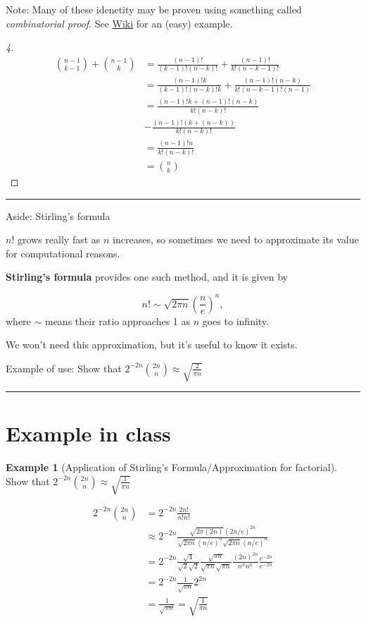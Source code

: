 \documentclass[
]{book}
\theoremstyle{definition}
\theoremstyle{definition}
\newtheorem{example}{Example}[chapter]
\theoremstyle{definition}
\theoremstyle{definition}
\theoremstyle{remark}
\begin{document}
Note: Many of these idenetity may be proven using something called \emph{combinatorial proof}. See \href{https://en.wikipedia.org/wiki/Combinatorial_proof}{Wiki} for an (easy) example.

\begin{proof}[4]
\begin{align*}
{n-1 \choose k-1} + {n-1 \choose k} &= \frac{(n-1)!}{(k-1)! (n-k)!} + \frac{(n-1)!}{k! (n-k-1)!}\\
&= \frac{(n-1)!k }{(k-1)! (n-k)!k} + \frac{(n-1)!(n-k)}{k! (n-k-1)!(n-1)} \\
&= \frac{(n-1)!k + (n-1)! (n-k)}{k! (n-k)!} \\
&- \frac{(n-1)!( k + (n-k))}{k! (n-k)!} \\
&= \frac{(n-1)! n}{k! (n-k)!} \\
&= {n \choose k}
\end{align*}
\end{proof}

\begin{center}\rule{0.5\linewidth}{0.5pt}\end{center}

Aside: Stirling's formula

\(n!\) grows really fast as \(n\) increases, so sometimes we need to approximate its value for computational reasons.

\textbf{Stirling's formula} provides one such method, and it is given by

\[
n! \sim \sqrt{2 \pi n} \left( \frac{n}{e} \right)^n,
\]
where \(\sim\) means their ratio approaches 1 as \(n\) goes to infinity.

We won't need this approximation, but it's useful to know it exists.

Example of use:
Show that \(2^{-2n}\binom{2n}{n} \approx \sqrt{\frac{2}{\pi n}}\)

\begin{center}\rule{0.5\linewidth}{0.5pt}\end{center}

\hypertarget{example-in-class}{%
\section{Example in class}\label{example-in-class}}

\begin{example}[Application of Stirling's Formula/Approximation for factorial]
Show that \(2^{-2n}{2n \choose n} \approx \sqrt{\frac{1}{\pi n}}\)

\begin{align*}
  2^{-2n}{2n \choose n} &= 2^{-2n}\frac{2n!}{n!n!} \\
  &\approx 2^{-2n} \frac{\sqrt{2\pi (2n)} (2n/e)^{2n}}{\sqrt{2\pi n} (n/e)^{n}\sqrt{2\pi n} (n/e)^{n}}\\
  &= 2^{-2n} \frac{\sqrt{4}}{\sqrt{2}\sqrt{2}} \frac{\sqrt{\pi n}}{\sqrt{\pi n}\sqrt{\pi n}} \frac{(2n)^{2n}}{n^n n^n} \frac{e^{-2n}}{e^{-2n}}\\
  &=  2^{-2n} \frac{1}{\sqrt{\pi n}} 2^{2n}\\
  &= \frac{1}{\sqrt{\pi n}} = \sqrt{\frac{1}{\pi n}}
\end{align*}
\end{example}
\end{document}
